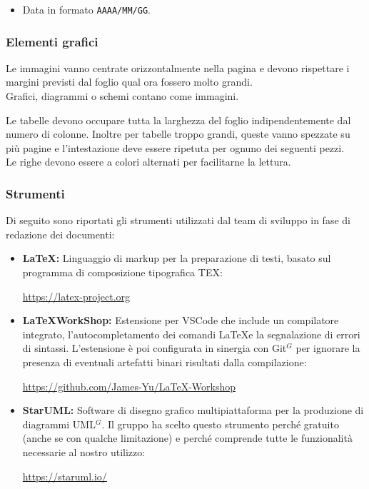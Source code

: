     \begin{itemize}
    \item Data in formato \texttt{AAAA/MM/GG}. %
    \end{itemize}

\subsubsection{Elementi grafici}

    Le immagini vanno centrate orizzontalmente nella pagina e devono rispettare i margini previsti dal foglio qual ora
    fossero molto grandi.\\
    Grafici, diagrammi o schemi contano come immagini.

    Le tabelle devono occupare tutta la larghezza del foglio indipendentemente dal numero di colonne.
    Inoltre per tabelle troppo grandi, queste vanno spezzate su più pagine e l'intestazione deve essere ripetuta
    per ognuno dei seguenti pezzi.\\
    Le righe devono essere a colori alternati per facilitarne la lettura.

\subsubsection{Strumenti}

Di seguito sono riportati gli strumenti utilizzati dal team di sviluppo in fase di redazione dei documenti:

\begin{itemize}
  \item \textbf{\LaTeX:} Linguaggio di markup per la preparazione di testi, basato sul programma di composizione tipografica TEX:
    \begin{center}
      \url{https://latex-project.org}
    \end{center}
  \item \textbf{\LaTeX WorkShop:} Estensione per VSCode che include un compilatore integrato, l'autocompletamento dei comandi \LaTeX e la segnalazione di errori di sintassi. L'estensione è poi configurata in sinergia con Git$^{G}$ per ignorare la presenza di eventuali artefatti binari risultati dalla compilazione:
  \begin{center}
    \url{https://github.com/James-Yu/LaTeX-Workshop}
  \end{center}
  \item \textbf{StarUML:} Software di disegno grafico multipiattaforma per la produzione di diagrammi UML$^{G}$. Il gruppo ha scelto questo strumento perché gratuito (anche se con qualche limitazione) e perché comprende tutte le funzionalità necessarie al nostro utilizzo:
  \begin{center}
    \url{https://staruml.io/}
  \end{center}
\end{itemize}


